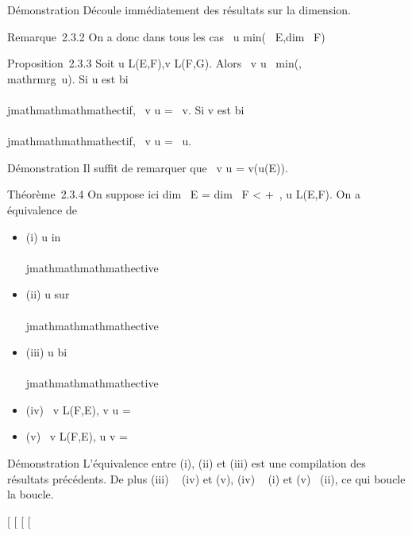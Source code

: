 Démonstration Découle immédiatement des résultats sur la dimension.

Remarque~2.3.2 On a donc dans tous les cas
\mathrmrg~u
\leq min(\dim~
E,dim~ F)

Proposition~2.3.3 Soit u \in L(E,F),v \in L(F,G). Alors
\mathrmrg~v \cdot u
\leq\
min(\mathrmrgv,\\mathrmrg~u).
Si u est bi\\\\jmathmathmathmathectif,
\mathrmrg~v \cdot u
= \mathrmrg~v. Si v est
bi\\\\jmathmathmathmathectif, \mathrmrg~v \cdot u
= \mathrmrg~u.

Démonstration Il suffit de remarquer que
\mathrmIm~v \cdot u = v(u(E)).

Théorème~2.3.4 On suppose ici dim~ E
= dim~ F \textless{} +\infty~, u \in L(E,F). On a
équivalence de

\begin{itemize}
\itemsep1pt\parskip0pt
\item
  (i) u in\\\\jmathmathmathmathective
\item
  (ii) u sur\\\\jmathmathmathmathective
\item
  (iii) u bi\\\\jmathmathmathmathective
\item
  (iv) \exists~v \in L(F,E), v \cdot u =
  \mathrmIdE
\item
  (v) \exists~v \in L(F,E), u \cdot v =
  \mathrmIdF
\end{itemize}

Démonstration L'équivalence entre (i), (ii) et (iii) est une compilation
des résultats précédents. De plus (iii) \rigtharrow~ (iv) et (v), (iv) \rigtharrow~ (i) et (v)
\rigtharrow~(ii), ce qui boucle la boucle.

{[}
{[}
{[}
{[}
